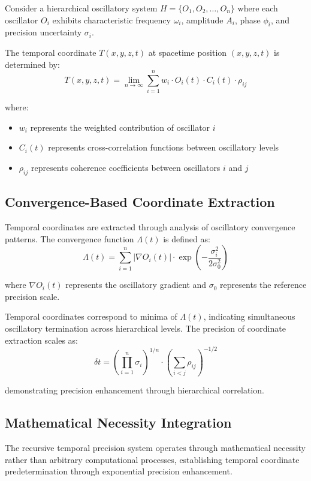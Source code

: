 \documentclass[12pt,a4paper]{article}
\begin{document}
Consider a hierarchical oscillatory system $H = \{O_1, O_2, \ldots, O_n\}$ where each oscillator $O_i$ exhibits characteristic frequency $\omega_i$, amplitude $A_i$, phase $\phi_i$, and precision uncertainty $\sigma_i$.

The temporal coordinate $T(x,y,z,t)$ at spacetime position $(x,y,z,t)$ is determined by:
$$T(x,y,z,t) = \lim_{n \to \infty} \sum_{i=1}^{n} w_i \cdot O_i(t) \cdot C_i(t) \cdot \rho_{ij}$$

where:
\begin{itemize}
\item $w_i$ represents the weighted contribution of oscillator $i$
\item $C_i(t)$ represents cross-correlation functions between oscillatory levels
\item $\rho_{ij}$ represents coherence coefficients between oscillators $i$ and $j$
\end{itemize}

\subsection{Convergence-Based Coordinate Extraction}

Temporal coordinates are extracted through analysis of oscillatory convergence patterns. The convergence function $\Lambda(t)$ is defined as:
$$\Lambda(t) = \sum_{i=1}^{n} |\nabla O_i(t)| \cdot \exp\left(-\frac{\sigma_i^2}{2\sigma_0^2}\right)$$

where $\nabla O_i(t)$ represents the oscillatory gradient and $\sigma_0$ represents the reference precision scale.

Temporal coordinates correspond to minima of $\Lambda(t)$, indicating simultaneous oscillatory termination across hierarchical levels. The precision of coordinate extraction scales as:
$$\delta t = \left(\prod_{i=1}^{n} \sigma_i\right)^{1/n} \cdot \left(\sum_{i<j} \rho_{ij}\right)^{-1/2}$$

demonstrating precision enhancement through hierarchical correlation.

\subsection{Mathematical Necessity Integration}

The recursive temporal precision system operates through mathematical necessity rather than arbitrary computational processes, establishing temporal coordinate predetermination through exponential precision enhancement.
\end{document}
